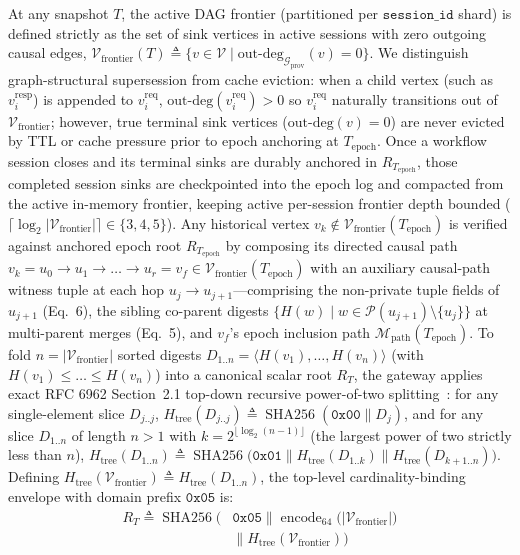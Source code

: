 \documentclass[conference,10pt]{IEEEtran}
\begin{document}
At any snapshot $T$, the active DAG frontier (partitioned per $\texttt{session\_id}$ shard) is defined strictly as the set of sink vertices in active sessions with zero outgoing causal edges, $\mathcal{V}_{\text{frontier}}(T) \triangleq \{v \in \mathcal{V} \mid \text{out-deg}_{\mathcal{G}_{\text{prov}}}(v) = 0\}$. We distinguish graph-structural supersession from cache eviction: when a child vertex (such as $v_i^{\text{resp}}$) is appended to $v_i^{\text{req}}$, $\text{out-deg}(v_i^{\text{req}}) > 0$ so $v_i^{\text{req}}$ naturally transitions out of $\mathcal{V}_{\text{frontier}}$; however, true terminal sink vertices ($\text{out-deg}(v) = 0$) are never evicted by TTL or cache pressure prior to epoch anchoring at $T_{\text{epoch}}$. Once a workflow session closes and its terminal sinks are durably anchored in $R_{T_{\text{epoch}}}$, those completed session sinks are checkpointed into the epoch log and compacted from the active in-memory frontier, keeping active per-session frontier depth bounded ($\lceil \log_2 |\mathcal{V}_{\text{frontier}}| \rceil \in \{3, 4, 5\}$). Any historical vertex $v_k \notin \mathcal{V}_{\text{frontier}}(T_{\text{epoch}})$ is verified against anchored epoch root $R_{T_{\text{epoch}}}$ by composing its directed causal path $v_k = u_0 \to u_1 \to \dots \to u_r = v_f \in \mathcal{V}_{\text{frontier}}(T_{\text{epoch}})$ with an auxiliary causal-path witness tuple at each hop $u_j \to u_{j+1}$---comprising the non-private tuple fields of $u_{j+1}$ (Eq.~6), the sibling co-parent digests $\{H(w) \mid w \in \mathcal{P}(u_{j+1}) \setminus \{u_j\}\}$ at multi-parent merges (Eq.~5), and $v_f$'s epoch inclusion path $\mathcal{M}_{\text{path}}(T_{\text{epoch}})$. To fold $n = |\mathcal{V}_{\text{frontier}}|$ sorted digests $D_{1..n} = \langle H(v_1), \dots, H(v_n) \rangle$ (with $H(v_1) \le \dots \le H(v_n)$) into a canonical scalar root $R_T$, the gateway applies exact RFC 6962 Section~2.1 top-down recursive power-of-two splitting~\cite{laurie2014certificate}: for any single-element slice $D_{j..j}$, $H_{\text{tree}}(D_{j..j}) \triangleq \operatorname{SHA256}(\mathtt{0x00} \parallel D_j)$, and for any slice $D_{1..n}$ of length $n > 1$ with $k = 2^{\lfloor \log_2(n - 1) \rfloor}$ (the largest power of two strictly less than $n$), $H_{\text{tree}}(D_{1..n}) \triangleq \operatorname{SHA256}\big(\mathtt{0x01} \parallel H_{\text{tree}}(D_{1..k}) \parallel H_{\text{tree}}(D_{k+1..n})\big)$. Defining $H_{\text{tree}}(\mathcal{V}_{\text{frontier}}) \triangleq H_{\text{tree}}(D_{1..n})$, the top-level cardinality-binding envelope with domain prefix $\mathtt{0x05}$ is:
\begin{equation}
\begin{split}
R_T \triangleq \operatorname{SHA256}\Big(&\mathtt{0x05} \parallel \operatorname{encode}_{64}\big(|\mathcal{V}_{\text{frontier}}|\big) \\
&\parallel H_{\text{tree}}(\mathcal{V}_{\text{frontier}})\Big)
\end{split}
\end{equation}
\end{document}
